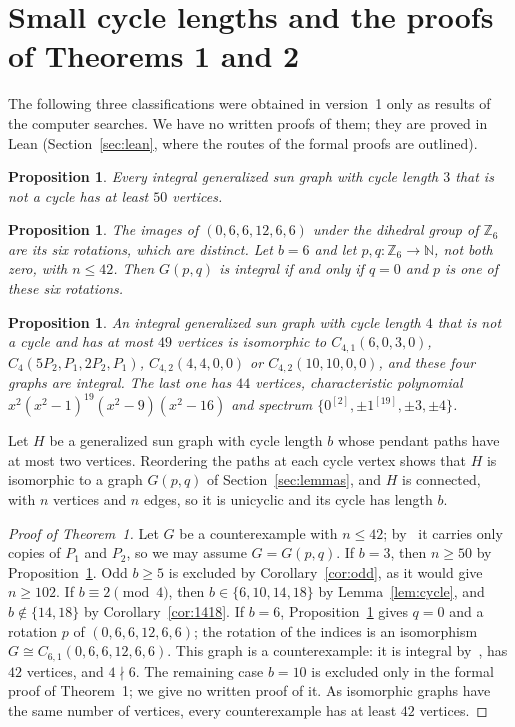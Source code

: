 \documentclass[11pt]{article}
\newtheorem{proposition}[lemma]{Proposition}
\theoremstyle{definition}
\theoremstyle{remark}
\newcommand{\Z}{\mathbb Z}
\begin{document}
\section{Small cycle lengths and the proofs of Theorems 1 and 2}\label{sec:proofs}

The following three classifications were obtained in version~1 only as results
of the computer searches. We have no written proofs of them; they are proved
in Lean (Section~\ref{sec:lean}, where the routes of the formal proofs are
outlined).

\begin{proposition}\label{prop:three}
Every integral generalized sun graph with cycle length $3$ that is not a cycle
has at least $50$ vertices.
\end{proposition}

\begin{proposition}\label{prop:six}
The images of $(0,6,6,12,6,6)$ under the dihedral group of $\Z_6$ are its six
rotations, which are distinct. Let $b=6$ and let $p,q\colon\Z_6\to\mathbb N$,
not both zero, with $n\le42$. Then $G(p,q)$ is integral if and only if $q=0$
and $p$ is one of these six rotations.
\end{proposition}

\begin{proposition}\label{prop:four}
An integral generalized sun graph with cycle length $4$ that is not a cycle
and has at most $49$ vertices is isomorphic to $C_{4,1}(6,0,3,0)$,
$C_4(5P_2,P_1,2P_2,P_1)$, $C_{4,2}(4,4,0,0)$ or $C_{4,2}(10,10,0,0)$, and these
four graphs are integral. The last one has $44$ vertices, characteristic
polynomial $x^2(x^2-1)^{19}(x^2-9)(x^2-16)$ and spectrum
$\{0^{[2]},\pm1^{[19]},\pm3,\pm4\}$.
\end{proposition}

Let $H$ be a generalized sun graph with cycle length $b$ whose pendant paths
have at most two vertices. Reordering the paths at each cycle vertex shows that
$H$ is isomorphic to a graph $G(p,q)$ of Section~\ref{sec:lemmas}, and $H$ is
connected, with $n$ vertices and $n$ edges, so it is unicyclic and its cycle
has length $b$.

\begin{proof}[Proof of Theorem~1]
Let $G$ be a counterexample with $n\le42$; by~\cite[Theorem~2.1]{bms} it
carries only copies of $P_1$ and $P_2$, so we may assume $G=G(p,q)$. If
$b=3$, then $n\ge50$ by Proposition~\ref{prop:three}. Odd $b\ge5$ is excluded
by Corollary~\ref{cor:odd}, as it would give $n\ge102$. If
$b\equiv2\pmod4$, then $b\in\{6,10,14,18\}$ by Lemma~\ref{lem:cycle}, and
$b\notin\{14,18\}$ by Corollary~\ref{cor:1418}. If $b=6$,
Proposition~\ref{prop:six} gives $q=0$ and a rotation $p$ of
$(0,6,6,12,6,6)$; the rotation of the indices is an isomorphism
$G\cong C_{6,1}(0,6,6,12,6,6)$. This graph is a counterexample: it is integral
by~\cite[Proposition~3.2]{bms}, has $42$ vertices, and $4\nmid6$. The
remaining case $b=10$ is excluded only in the formal proof of Theorem~1; we
give no written proof of it. As isomorphic graphs have the same number of
vertices, every counterexample has at least $42$ vertices.
\end{proof}
\end{document}
